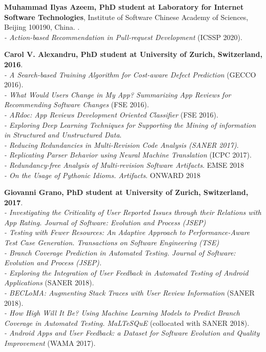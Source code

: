 \documentclass[10pt]{article}
\begin{document}
\begin{bibsection}
\item \textbf{Muhammad Ilyas Azeem, PhD student at Laboratory for Internet Software Technologies}, Institute of Software Chinese Academy of Sciences, Beijing 100190, China. .\\
       \textit{- Action-based Recommendation in Pull-request Development}  (ICSSP 2020).\\

\item \textbf{Carol V. Alexandru, PhD student at University of Zurich, Switzerland, 2016}.\\
       \textit{- A Search-based Training Algorithm for Cost-aware Defect Prediction} (GECCO 2016).\\
              \textit{- What Would Users Change in My App? Summarizing App Reviews for Recommending Software Changes} (FSE 2016).\\
               \textit{- ARdoc: App Reviews Development Oriented Classifier} (FSE 2016).\\
        \textit{- Exploring Deep Learning Techniques for Supporting the Mining of information
        in Structured and Unstructured Data}.\\
        \textit{- Reducing Redundancies in Multi-Revision Code Analysis (SANER 2017)}. \\
        \textit{- Replicating Parser Behavior using Neural Machine Translation} (ICPC 2017).\\
        \textit{- Redundancy-free Analysis of Multi-revision Software Artifacts}.  EMSE 2018\\
        \textit{- On the Usage of Pythonic Idioms. Artifacts}.  ONWARD 2018\\
\item \textbf{Giovanni Grano, PhD student at University of Zurich, Switzerland, 2017}.\\ 
          \textit{- Investigating the Criticality of User Reported Issues through their Relations with App Rating. Journal of Software: Evolution and Process (JSEP)}  
                 \\   \textit{- Testing with Fewer Resources: An Adaptive Approach to Performance-Aware Test Case Generation.  Transactions on Software Engineering (TSE)} 
         \\  \textit{- Branch Coverage Prediction in Automated Testing.  Journal of Software: Evolution and Process (JSEP).} \\
         \textit{- Exploring the Integration of User Feedback in Automated Testing of Android Applications}  (SANER 2018).  \\  
         \textit{- BECLoMA: Augmenting Stack Traces with User Review Information}  (SANER 2018).  \\
         \textit{- How High Will It Be? Using Machine Learning Models to Predict Branch Coverage in Automated Testing.  \emph{MaLTeSQuE}}  (collocated with SANER 2018).  \\
       \textit{- Android Apps and User Feedback: a Dataset for Software Evolution and Quality Improvement}  (WAMA 2017). \\    
         

\end{bibsection}
\end{document}
